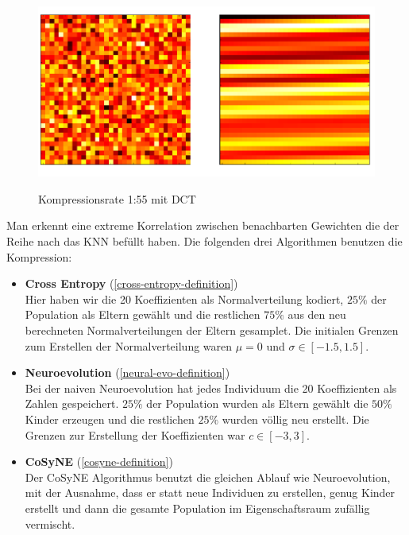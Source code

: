         \begin{figure}[H]
            \begin{center}
                \includegraphics[scale=0.35]{../pictures/DCT-my-case-cropped.png}\\
                \caption{Kompressionsrate 1:55 mit DCT}\label{fig:dct-my-case}
            \end{center}
        \end{figure}

        \noindent
        Man erkennt eine extreme Korrelation zwischen benachbarten Gewichten die der Reihe nach das KNN befüllt haben. Die folgenden drei Algorithmen benutzen die Kompression:

        \begin{itemize}
            \setlength\itemsep{1em}
            \item \textbf{Cross Entropy} (\ref{cross-entropy-definition}) \\
            Hier haben wir die 20 Koeffizienten als Normalverteilung kodiert, $25\%$ der Population als Eltern gewählt und die restlichen $75\%$ aus den neu berechneten Normalverteilungen der Eltern gesamplet. Die initialen Grenzen zum Erstellen der Normalverteilung waren $\mu = 0$ und $\sigma \in [-1.5,1.5]$.

            \item \textbf{Neuroevolution} (\ref{neural-evo-definition}) \\
            Bei der naiven Neuroevolution hat jedes Individuum die 20 Koeffizienten als Zahlen gespeichert. $25\%$ der Population wurden als Eltern gewählt die $50\%$ Kinder erzeugen und die restlichen $25\%$ wurden völlig neu erstellt. Die Grenzen zur Erstellung der Koeffizienten war $c \in [-3,3]$.

            \item \textbf{CoSyNE} (\ref{cosyne-definition}) \\
            Der CoSyNE Algorithmus benutzt die gleichen Ablauf wie Neuroevolution, mit der Ausnahme, dass er statt neue Individuen zu erstellen, genug Kinder erstellt und dann die gesamte Population im Eigenschaftsraum zufällig vermischt.

        \end{itemize}

